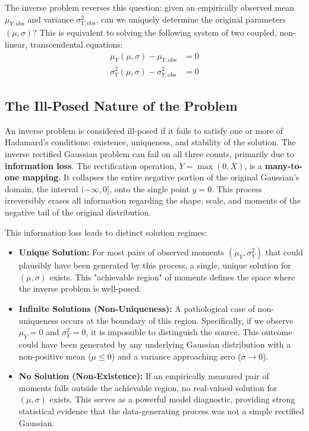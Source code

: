 The inverse problem reverses this question: given an empirically observed mean $\mu_{Y, \text{obs}}$ and variance $\sigma^2_{Y, \text{obs}}$, can we uniquely determine the original parameters $(\mu, \sigma)$? This is equivalent to solving the following system of two coupled, non-linear, transcendental equations:
\begin{align}
    \mu_Y(\mu, \sigma) - \mu_{Y, \text{obs}} &= 0 \\
    \sigma^2_Y(\mu, \sigma) - \sigma^2_{Y, \text{obs}} &= 0
\end{align}

\subsection{The Ill-Posed Nature of the Problem}
An inverse problem is considered ill-posed if it fails to satisfy one or more of Hadamard's conditions: existence, uniqueness, and stability of the solution. The inverse rectified Gaussian problem can fail on all three counts, primarily due to \textbf{information loss}. The rectification operation, $Y = \max(0, X)$, is a \textbf{many-to-one mapping}. It collapses the entire negative portion of the original Gaussian's domain, the interval $(-\infty, 0]$, onto the single point $y=0$. This process irreversibly erases all information regarding the shape, scale, and moments of the negative tail of the original distribution.

This information loss leads to distinct solution regimes:
\begin{itemize}
    \item \textbf{Unique Solution:} For most pairs of observed moments $(\mu_Y, \sigma^2_Y)$ that could plausibly have been generated by this process, a single, unique solution for $(\mu, \sigma)$ exists. This "achievable region" of moments defines the space where the inverse problem is well-posed.
    \item \textbf{Infinite Solutions (Non-Uniqueness):} A pathological case of non-uniqueness occurs at the boundary of this region. Specifically, if we observe $\mu_Y = 0$ and $\sigma^2_Y = 0$, it is impossible to distinguish the source. This outcome could have been generated by any underlying Gaussian distribution with a non-positive mean ($\mu \le 0$) and a variance approaching zero ($\sigma \to 0$).
    \item \textbf{No Solution (Non-Existence):} If an empirically measured pair of moments falls outside the achievable region, no real-valued solution for $(\mu, \sigma)$ exists. This serves as a powerful model diagnostic, providing strong statistical evidence that the data-generating process was not a simple rectified Gaussian.
\end{itemize}

